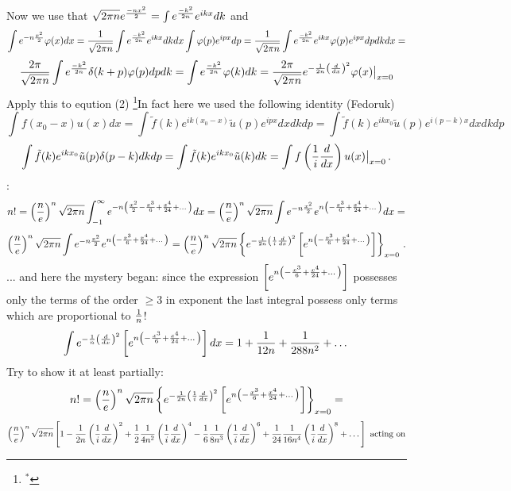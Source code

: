 Now  we use that
      $
  \sqrt {2\pi n}e^{-nx^2\over 2}=
\int e^{-k^2\over 2n}e^{ikx}dk
       $ 
and
     $$
\int e^{-n{x^2\over 2}}
      \varphi(x)dx=
{1\over \sqrt {2\pi n}}
\int e^{-k^2\over 2n}e^{ikx}dkdx
\int \varphi (p)e^{ipx}dp=
{1\over \sqrt {2\pi n}}
\int  e^{-k^2\over 2n}e^{ikx}\varphi (p)e^{ipx}dpdkdx=
     $$
        $$  
{2\pi \over \sqrt {2\pi n}}
\int e^{-k^2\over 2n}\delta (k+p)\varphi (p)dpdk
=\int e^{-k^2\over 2n}\varphi (k)dk=
{2\pi \over \sqrt {2\pi n}}
 e^{-{1\over 2n}\left({d\over
dx}\right)^2}\varphi(x)\big\vert_{x=0}
        $$
 Apply this to eqution (2)
\footnote{$^{*}$}{In fact here
we used the following
identity (Fedoruk) 
      $$
\int f(x_0-x)u(x)dx=
\int \tilde f(k)
e^{ik(x_0-x)}
\tilde u(p)e^{ipx}dx dk dp=
\int \tilde f(k)
e^{ikx_0}
\tilde u(p)e^{i(p-k)x}dx dk dp
      $$
     $$
\int \tilde f(k)
e^{ikx_0}
\tilde u(p)\delta(p-k) dk dp=
\int \tilde f(k)
e^{ikx_0}
\tilde u(k) dk=
\int f\left({1\over i}{d\over dx}\right)
      u(x)\big\vert_{x=0}\,.
     $$
}:
 $$
n!=
\left(n\over e\right)^n\sqrt {2\pi n}
\int_{-1}^\infty e^{-n
   \left(
  {x^2\over 2 }
- {x^3\over 6 }
 +{x^4\over 24 }+\dots
   \right)}dx=
\left(n\over e\right)^n\sqrt {2\pi n}
\int e^{-n{x^2\over 2}}
     e^{
      n
     \left(
- {x^3\over 6 }
 +{x^4\over 24 }+\dots
     \right)
 }dx=
      $$
      $$
\left(n\over e\right)^n\sqrt {2\pi n}
\int e^{-n{x^2\over 2}}
     e^{
      n
     \left(
- {x^3\over 6 }
 +{x^4\over 24 }+\dots
     \right)
 }=
\left(n\over e\right)^n\sqrt {2\pi n}
\left\{
 e^{-{1\over 2n}\left({1\over i}
 {d\over dx}\right)^2}
    \left[
     e^{
      n
     \left(
- {x^3\over 6 }
 +{x^4\over 24 }+\dots
     \right)
 } 
\right]
\right\}_{x=0}\,.
     $$
... and here the mystery began: since the expression
$    \left[
     e^{
      n
     \left(
- {x^3\over 6 }
 +{x^4\over 24 }+\dots
     \right)
 } 
\right]$ possesses only the terms of the order $\geq 3$
in exponent the last integral possess only terms
which are proportional to $1\over n $!
    $$
\int e^{-{1\over n}\left({d\over dx}\right)^2}
    \left[
     e^{
      n
     \left(
- {x^3\over 6 }
 +{x^4\over 24 }+\dots
     \right)
 } 
\right]dx=
1+{1\over 12 n}+{1\over 288 n^2}+\dots
    $$
Try to show it at least partially:
 $$
n!=
\left(n\over e\right)^n\sqrt {2\pi n}
\left\{
 e^{-{1\over 2n}
  \left(
   {1\over i}
{d\over dx}
    \right)^2
      }
    \left[
     e^{
      n
     \left(
- {x^3\over 6 }
 +{x^4\over 24 }+\dots
     \right)
 } 
\right]
   \right\}_{x=0}=
     $$
    $$
\left(n\over e\right)^n\sqrt {2\pi n}
\left[1
       -
      {1\over 2n}
  \left(
    {1\over i}
{d\over dx}
     \right)^2
     +
    {1\over 2}
  {1\over 4n^2}
  \left(
    {1\over i}
{d\over dx}
     \right)^4
   -
    {1\over 6}
  {1\over 8n^3}
  \left(
    {1\over i}
{d\over dx}
     \right)^6
+
    {1\over 24}
  {1\over 16n^4}
  \left(
    {1\over i}
{d\over dx}
     \right)^8
         +\dots
\right]\,\,
 \hbox {acting on}
     $$
